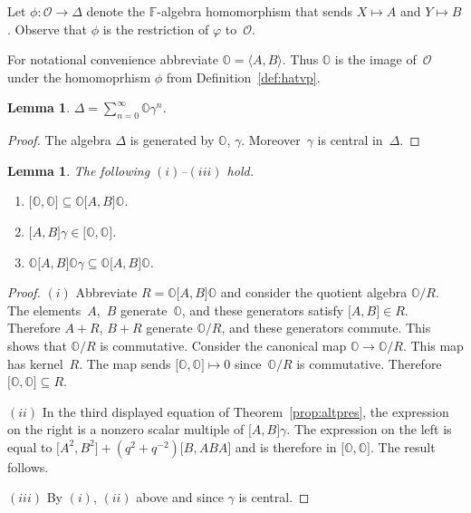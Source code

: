 \documentclass[10pt,a4paper]{amsart}
\numberwithin{equation}{section}
\newtheorem{Lemma}[Theorem]{Lemma}
\begin{document}
\begin{Definition}
\label{def:hatvp}
Let $\phi: {\mathcal O} \to \Delta $
denote the $\mathbb F$-algebra homomorphism that sends
$X\mapsto A$ and $Y\mapsto B$. Observe that
$\phi$ is the restriction of
$ \varphi $ to~${\mathcal O}$.
\end{Definition}

\begin{Definition}
\label{def:hatu}
For notational convenience abbreviate
$\mathbb O =\langle A,B\rangle$. Thus
$\mathbb O$ is the image of~$\mathcal O$ under
the homomoprhism $\phi$
from Def\/inition~\ref{def:hatvp}.
\end{Definition}

\begin{Lemma}
\label{lem:notdir}
$\Delta = \sum_{n=0}^\infty \mathbb O \gamma^n$.
\end{Lemma}

\begin{proof}
 The
 algebra $\Delta $ is generated by
 $\mathbb O$, $\gamma$.
Moreover~$\gamma$ is central in~$\Delta $.
\end{proof}

\begin{Lemma}
\label{lem:three}
The following $(i)$--$(iii)$ hold.
\begin{enumerate}\itemsep=0pt
\item[$(i)$]
$\lbrack \mathbb O,\mathbb O\rbrack \subseteq
\mathbb O \lbrack A,B\rbrack \mathbb O$.
\item[$(ii)$]
$  \lbrack A,B\rbrack
\gamma \in
\lbrack \mathbb O,\mathbb O\rbrack $.
\item[$(iii)$]
$\mathbb O \lbrack A,B\rbrack \mathbb O \gamma \subseteq
\mathbb O \lbrack A,B\rbrack \mathbb O$.
\end{enumerate}
\end{Lemma}
\begin{proof}\sloppy
$(i)$
Abbreviate $R=
\mathbb O \lbrack A,B\rbrack \mathbb O$ and consider the
quotient algebra $\mathbb O/R$.
The ele\-ments~$A$,~$B$ generate~$\mathbb O$, and
these generators satisfy
$\lbrack A,B\rbrack \in R$.
Therefore $A+R$, $B+R$ generate
$\mathbb O/R$, and these generators commute.
This shows that $\mathbb O/R$ is commutative.
Consider the canonical map $\mathbb O \to \mathbb O/R$.
This map has kernel~$R$. The map sends
$\lbrack \mathbb O,\mathbb O\rbrack \mapsto 0 $ since~$\mathbb O/R$ is commutative. Therefore
$\lbrack \mathbb O,\mathbb O\rbrack \subseteq R$.

  $(ii)$ In the third displayed equation of
Theorem~\ref{prop:altpres},
the expression on the right is a nonzero
scalar multiple of
$\lbrack A,B \rbrack \gamma $.
The expression on the left
is equal to
$\lbrack A^2,B^2 \rbrack +(q^2+q^{-2})
\lbrack B,ABA \rbrack $
and is therefore in
$\lbrack \mathbb O,\mathbb O\rbrack $.
The result follows.

  $(iii)$ By $(i)$, $(ii)$ above and
since $\gamma$ is central.
\end{proof}
\end{document}
